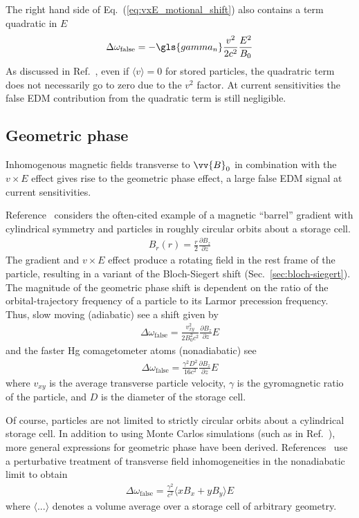 The right hand side of Eq.~(\ref{eq:vxE_motional_shift}) also contains a term quadratic in $E$
%
\begin{gather}
    \Delta\omega_\text{false} = -\gls{gamma_n} \frac{v^2}{2c^2}\frac{E^2}{B_0} 
\end{gather}
%
As discussed in Ref.~\cite{lamoreaux_experimental_2009}, even if $\langle v \rangle=0$ for stored particles, the quadratric term does not necessarily go to zero due to the $v^2$ factor. At current sensitivities the false EDM contribution from the quadratic term is still negligible.

\subsection*{Geometric phase}

Inhomogenous magnetic fields transverse to $\vv{B}_0$ in combination with the $v\times E$ effect gives rise to the geometric phase effect, a large false EDM signal at current sensitivities. 

Reference~\cite{pendlebury_geometric-phase-induced_2004} considers the often-cited example of a  magnetic ``barrel'' gradient with cylindrical symmetry and particles in roughly circular orbits about a storage cell.
%
\begin{gather}
    B_r(r)=\frac{r}{2}\frac{\partial B_z}{\partial z}
\end{gather}
%
The gradient and $v\times E$ effect produce a rotating field in the rest frame of the particle, resulting in a variant of the Bloch-Siegert shift (Sec.~\ref{sec:bloch-siegert}). The magnitude of the geometric phase shift is dependent on the ratio of the orbital-trajectory frequency of a particle to its Larmor precession frequency. Thus, slow moving \ucn (adiabatic) see a shift given by~\cite{pendlebury_geometric-phase-induced_2004, afach_measurement_2015}
%
\begin{gather}
    \Delta\omega_\text{false} = \frac{v^2_{xy}}{2 B_0^2 c^2}\frac{\partial B_z}{\partial z}E
\end{gather}
%
and the faster Hg comagetometer atoms (nonadiabatic) see
%
\begin{gather}
    \Delta\omega_\text{false} = \frac{\gamma^2 D^2}{16  c^2}\frac{\partial B_z}{\partial z}E
\end{gather}
%
where $v_{xy}$ is the average transverse particle velocity, $\gamma$ is the gyromagnetic ratio of the particle, and $D$ is the diameter of the storage cell. 

Of course, particles are not limited to strictly circular orbits about a cylindrical storage cell. In addition to using Monte Carlos simulations (such as in Ref.~\cite{pignol_magic_2019}), more general expressions for geometric phase have been derived. References~\cite{pignol_geometric_phase_2012, pignol_geometric_phase_2015} use a perturbative treatment of transverse field inhomogeneities in the nonadiabatic limit to obtain
%
\begin{gather}
    \Delta\omega_\text{false} = \frac{\gamma^2}{c^2}\langle xB_x + yB_y \rangle E
\end{gather}
%
where $\langle ... \rangle$ denotes a volume average over a storage cell of arbitrary geometry.

